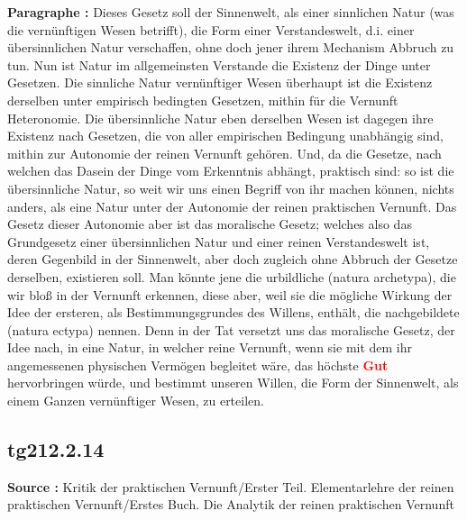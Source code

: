 \documentclass[a4paper,12pt,twoside]{book}
\newcommand{\match}[1]{\textcolor{red}{\textbf{#1}}}
\begin{document}
	\textbf{Paragraphe : }Dieses Gesetz soll der Sinnenwelt, als einer sinnlichen Natur (was die vernünftigen Wesen betrifft), die Form einer Verstandeswelt, d.i. einer übersinnlichen Natur verschaffen, ohne doch jener ihrem Mechanism Abbruch zu tun. Nun ist Natur im allgemeinsten Verstande die Existenz der Dinge unter Gesetzen. Die sinnliche Natur vernünftiger Wesen überhaupt ist die Existenz derselben unter empirisch bedingten Gesetzen, mithin für die Vernunft Heteronomie. Die übersinnliche Natur eben derselben Wesen ist dagegen ihre Existenz nach Gesetzen, die von aller empirischen Bedingung unabhängig sind, mithin zur Autonomie der reinen Vernunft gehören. Und, da die Gesetze, nach welchen  das Dasein der Dinge vom Erkenntnis abhängt, praktisch sind: so ist die übersinnliche Natur, so weit wir uns einen Begriff von ihr machen können, nichts anders, als eine Natur unter der Autonomie der reinen praktischen Vernunft. Das Gesetz dieser Autonomie aber ist das moralische Gesetz; welches also das Grundgesetz einer übersinnlichen Natur und einer reinen Verstandeswelt ist, deren Gegenbild in der Sinnenwelt, aber doch zugleich ohne Abbruch der Gesetze derselben, existieren soll. Man könnte jene die urbildliche (natura archetypa), die wir bloß in der Vernunft erkennen, diese aber, weil sie die mögliche Wirkung der Idee der ersteren, als Bestimmungsgrundes des Willens, enthält, die nachgebildete (natura ectypa) nennen. Denn in der Tat versetzt uns das moralische Gesetz, der Idee nach, in eine Natur, in welcher reine Vernunft, wenn sie mit dem ihr angemessenen physischen Vermögen begleitet wäre, das höchste \match{Gut} hervorbringen würde, und bestimmt unseren Willen, die Form der Sinnenwelt, als einem Ganzen vernünftiger Wesen, zu erteilen. 
	
	\subsection*{tg212.2.14} 
	\textbf{Source : }Kritik der praktischen Vernunft/Erster Teil. Elementarlehre der reinen praktischen Vernunft/Erstes Buch. Die Analytik der reinen praktischen Vernunft\\  
	
\end{document}
